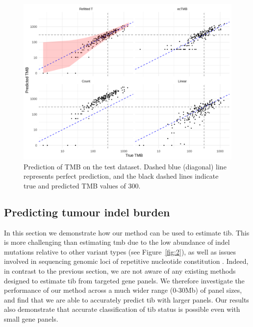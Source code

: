 \documentclass[../thesis.tex]{subfiles}
\begin{document}
\begin{figure}[htbp]
\centering
\includegraphics[width=5.5in]{figures/chapter3/fig8.png}
\vspace*{-5mm}
\caption{Prediction of TMB on the test dataset. Dashed blue (diagonal) line represents perfect prediction, and the black dashed lines indicate true and predicted TMB values of 300. \label{fig:8}}
\vspace*{-2mm}
\end{figure} 


\subsection{Predicting tumour indel burden \label{sec:indel}}



In this section we demonstrate how our method can be used to estimate \gls{tib}. 
This is more challenging than estimating \gls{tmb} due to the low abundance of indel mutations relative to other variant types (see Figure~\ref{fig:2}), as well as issues involved in sequencing genomic loci of repetitive nucleotide constitution \citep{narzisi_challenge_2015}. Indeed, in contrast to the previous section, we are not aware of any existing methods designed to estimate \gls{tib} from targeted gene panels.  We therefore investigate the performance of our method across a much wider range (0-30Mb) of panel sizes, and find that we are able to accurately predict \gls{tib} with larger panels.
Our results also demonstrate that accurate classification of \gls{tib} status is possible even with small gene panels. 
\end{document}

